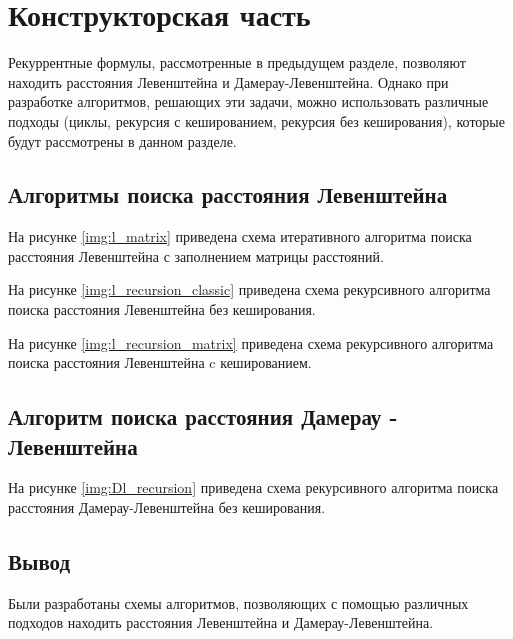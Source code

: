 \chapter{Конструкторская часть}

Рекуррентные формулы, рассмотренные в предыдущем разделе, позволяют находить расстояния Левенштейна и Дамерау-Левенштейна. Однако при разработке алгоритмов, решающих эти задачи, можно использовать различные подходы (циклы, рекурсия с кешированием, рекурсия без кеширования), которые будут рассмотрены в данном разделе.

\section{Алгоритмы поиска расстояния Левенштейна}

На рисунке \ref{img:l_matrix} приведена схема итеративного алгоритма поиска расстояния Левенштейна с заполнением матрицы расстояний.


На рисунке \ref{img:l_recursion_classic} приведена схема рекурсивного алгоритма поиска расстояния Левенштейна без кеширования.


На рисунке \ref{img:l_recursion_matrix} приведена схема рекурсивного алгоритма поиска расстояния Левенштейна c кешированием.


\section{Алгоритм поиска расстояния Дамерау - Левенштейна}

На рисунке \ref{img:Dl_recursion} приведена схема рекурсивного алгоритма поиска расстояния Дамерау-Левенштейна без кеширования.




\section*{Вывод}

Были разработаны схемы алгоритмов, позволяющих с помощью различных подходов находить расстояния Левенштейна и Дамерау-Левенштейна.


